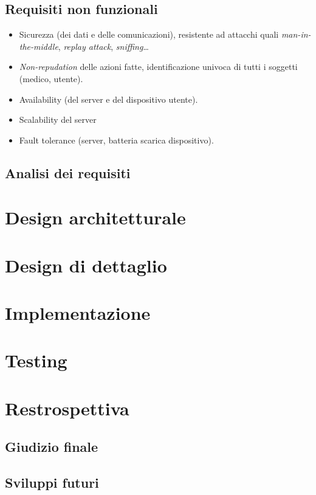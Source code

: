 \documentclass[a4paper,12pt]{report}
\begin{document}
\section{Requisiti non funzionali}
\begin{itemize}
	\item Sicurezza (dei dati e delle comunicazioni), resistente ad attacchi quali \emph{man-in-the-middle}, \emph{replay attack}, \emph{sniffing}\dots 
	\item \emph{Non-repudation} delle azioni fatte, identificazione univoca di tutti i soggetti (medico, utente). 
	\item Availability (del server e del dispositivo utente).
	\item Scalability del server
	\item Fault tolerance (server, batteria scarica dispositivo).
\end{itemize}
\section{Analisi dei requisiti}


\chapter{Design architetturale}


\chapter{Design di dettaglio}

\chapter{Implementazione}

\chapter{Testing} 


\chapter{Restrospettiva}
\section{Giudizio finale}
\section{Sviluppi futuri}

 
\end{document}

